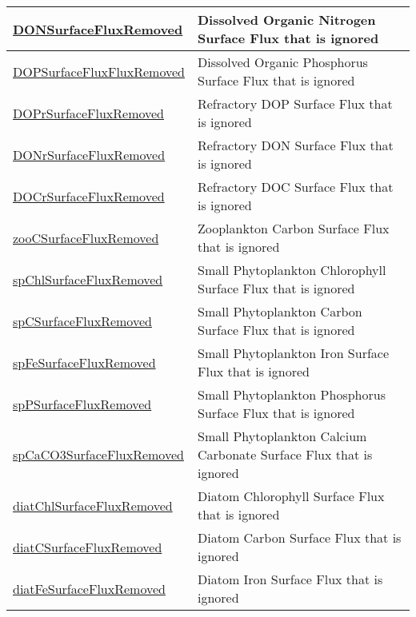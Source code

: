 {\begin{center}
\begin{longtable}{| p{2.0in} | p{4.0in} |}
    \hline
    \hyperref[subsec:var_sec_forcing_DONSurfaceFluxRemoved]{DONSurfaceFluxRemoved} & Dissolved Organic Nitrogen Surface Flux that is ignored \\
    \hline
    \hyperref[subsec:var_sec_forcing_DOPSurfaceFluxFluxRemoved]{DOPSurfaceFluxFluxRemoved} & Dissolved Organic Phosphorus Surface Flux that is ignored \\
    \hline
    \hyperref[subsec:var_sec_forcing_DOPrSurfaceFluxRemoved]{DOPrSurfaceFluxRemoved} & Refractory DOP Surface Flux that is ignored \\
    \hline
    \hyperref[subsec:var_sec_forcing_DONrSurfaceFluxRemoved]{DONrSurfaceFluxRemoved} & Refractory DON Surface Flux that is ignored \\
    \hline
    \hyperref[subsec:var_sec_forcing_DOCrSurfaceFluxRemoved]{DOCrSurfaceFluxRemoved} & Refractory DOC Surface Flux that is ignored \\
    \hline
    \hyperref[subsec:var_sec_forcing_zooCSurfaceFluxRemoved]{zooCSurfaceFluxRemoved} & Zooplankton Carbon Surface Flux that is ignored \\
    \hline
    \hyperref[subsec:var_sec_forcing_spChlSurfaceFluxRemoved]{spChlSurfaceFluxRemoved} & Small Phytoplankton Chlorophyll Surface Flux that is ignored \\
    \hline
    \hyperref[subsec:var_sec_forcing_spCSurfaceFluxRemoved]{spCSurfaceFluxRemoved} & Small Phytoplankton Carbon Surface Flux that is ignored \\
    \hline
    \hyperref[subsec:var_sec_forcing_spFeSurfaceFluxRemoved]{spFeSurfaceFluxRemoved} & Small Phytoplankton Iron Surface Flux that is ignored \\
    \hline
    \hyperref[subsec:var_sec_forcing_spPSurfaceFluxRemoved]{spPSurfaceFluxRemoved} & Small Phytoplankton Phosphorus Surface Flux that is ignored \\
    \hline
    \hyperref[subsec:var_sec_forcing_spCaCO3SurfaceFluxRemoved]{spCaCO3SurfaceFluxRemoved} & Small Phytoplankton Calcium Carbonate Surface Flux that is ignored \\
    \hline
    \hyperref[subsec:var_sec_forcing_diatChlSurfaceFluxRemoved]{diatChlSurfaceFluxRemoved} & Diatom Chlorophyll Surface Flux that is ignored \\
    \hline
    \hyperref[subsec:var_sec_forcing_diatCSurfaceFluxRemoved]{diatCSurfaceFluxRemoved} & Diatom Carbon Surface Flux that is ignored \\
    \hline
    \hyperref[subsec:var_sec_forcing_diatFeSurfaceFluxRemoved]{diatFeSurfaceFluxRemoved} & Diatom Iron Surface Flux that is ignored \\

\end{longtable}
\end{center}}
